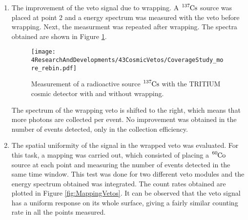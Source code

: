 \begin{enumerate}

\item{} The improvement of the veto signal due to wrapping. A $\ce{^{137}Cs}$ source was placed at point 2 and a energy spectrum was measured with the veto before wrapping. Next, the measurment was repeated after wrapping. The spectra obtained are shown in Figure \ref{fig:VetoCoverageImprovement}.

\begin{figure}[h]
\centering
\texttt{[image: 4ResearchAndDevelopments/43CosmicVetos/CoverageStudy\_more\_rebin.pdf]}
\caption{Measurement of a radioactive source $\ce{^{137}Cs}$ with the TRITIUM cosmic detector with and without wrapping.\label{fig:VetoCoverageImprovement}}
\end{figure}

The spectrum of the wrapping veto is shifted to the right, which means that more photons are collected per event. No improvement was obtained in the number of events detected, only in the collection efficiency.


\item{} The spatial uniformity of the signal in the wrapped veto was evaluated. For this task, a mapping was carried out, which consisted of placing a $\ce{^{60}Co}$ source at each point and measuring the number of events detected in the same time window. This test was done for two different veto modules and the energy spectrum obtained was integrated. The count rates obtained are plotted in Figure \ref{fig:MappingVetos}. It can be observed that the veto signal has a uniform response on its whole surface, giving a fairly similar counting rate in all the points measured.



\end{enumerate}
